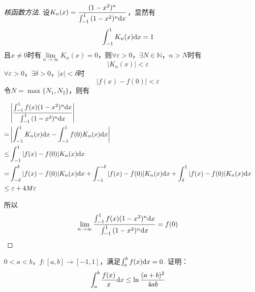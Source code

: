 \begin{proof}[核函数方法]

    设$K_n(x) = \dfrac{(1 - x^2)^n}{\int_{-1}^{1}{(1 - x^2)^n}\mathrm{d} x}$，显然有
    \[\int_{-1}^{1}{K_n(x)}\mathrm{d} x = 1\]
    且$x \neq 0$时有$\lim\limits_{n \to \infty}{K_n(x)} = 0$，则$\forall \varepsilon > 0$，$\exists N \in \mathbb{N}$，$n > N$时有
    \[|K_n(x)| < \varepsilon\]
    $\forall \varepsilon > 0$，$\exists \delta > 0$，$|x| < \delta$时
    \[| f(x) - f(0) | < \varepsilon\]
    令$N = \max\{N_1, N_2\}$，则有

    \begin{align*}
        & \left| \dfrac{\int_{-1}^{1}{f(x)(1 - x^2)^n}\mathrm{d} x}{\int_{-1}^{1}{(1 - x^2)^n}\mathrm{d} x} \right| \\
        = & \left| \int_{-1}^{1}{K_n(x)}\mathrm{d} x - \int_{-1}^{1}{f(0)K_n(x)}\mathrm{d} x \right| \\
        \leq & \int_{-1}^{1}{|f(x) - f(0)|K_n(x)}\mathrm{d} x \\
        = & \int_{-\delta}^{\delta}{|f(x) - f(0)|K_n(x)}\mathrm{d} x + \int_{-1}^{-\delta}{|f(x) - f(0)|K_n(x)}\mathrm{d} x + \int_{\delta}^{1}{|f(x) - f(0)|K_n(x)}\mathrm{d} x \\
        \leq & \  \varepsilon + 4M\varepsilon
    \end{align*}

    所以
    \[\lim\limits_{n \to \infty}{\dfrac{\int_{-1}^{1}{f(x)(1 - x^2)^n}\mathrm{d} x}{\int_{-1}^{1}{(1 - x^2)^n}\mathrm{d} x}} = f(0)\]

\end{proof}

\begin{proposition}

    $0 < a < b$，$f:[a, b] \to [-1, 1]$，满足$\int_{a}^{b}{f(x)}\mathrm{d} x = 0$. 证明：
    \[\int_{a}^{b}{\dfrac{f(x)}{x}}\mathrm{d} x \leq \ln{\dfrac{(a + b)^2}{4ab}}\]

\end{proposition}

